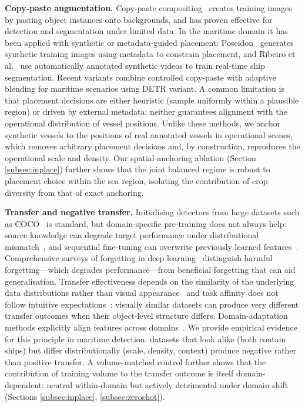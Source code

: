 \documentclass[10pt,conference]{IEEEtran}
\begin{document}
\textbf{Copy-paste augmentation.} Copy-paste compositing~\cite{ghiasi2021simple} creates training images by pasting object instances onto backgrounds, and has proven effective for detection and segmentation under limited data. In the maritime domain it has been applied with synthetic or metadata-guided placement: Poseidon~\cite{ruizponce2023poseidon} generates synthetic training images using metadata to constrain placement, and Ribeiro et al.~\cite{ribeiro2022synthetic} use automatically annotated synthetic videos to train real-time ship segmentation. Recent variants combine controlled copy-paste with adaptive blending for maritime scenarios using DETR variant\cite{nemati2025rtdetr}. A common limitation is that placement decisions are either heuristic (sample uniformly within a plausible region) or driven by external metadata; neither guarantees alignment with the operational distribution of vessel positions. Unlike these methods, we anchor synthetic vessels to the positions of real annotated vessels in operational scenes, which removes arbitrary placement decisions and, by construction, reproduces the operational scale and density. Our spatial-anchoring ablation (Section \ref{subsec:inplace}) further shows that the joint balanced regime is robust to placement choice within the sea region, isolating the contribution of crop diversity from that of exact anchoring.

\textbf{Transfer and negative transfer.} Initialising detectors from large datasets such as COCO~\cite{lin2014microsoft} is standard, but domain-specific pre-training does not always help: source knowledge can degrade target performance under distributional mismatch~\cite{zhang2023negative}, and sequential fine-tuning can overwrite previously learned features~\cite{mccloskey1989catastrophic}. Comprehensive surveys of forgetting in deep learning~\cite{yang2024forgetting} distinguish harmful forgetting—which degrades performance—from beneficial forgetting that can aid generalisation. Transfer effectiveness depends on the similarity of the underlying data distributions rather than visual appearance~\cite{cui2018large} and task affinity does not follow intuitive expectations~\cite{zamir2018taskonomy}: visually similar datasets can produce very different transfer outcomes when their object-level structure differs. Domain-adaptation methods explicitly align features across domains~\cite{chen2018domain}. We provide empirical evidence for this principle in maritime detection: datasets that look alike (both contain ships) but differ distributionally (scale, density, context) produce negative rather than positive transfer. A volume-matched control further shows that the contribution of training volume to the transfer outcome is itself domain-dependent: neutral within-domain but actively detrimental under domain shift (Sections \ref{subsec:inplace}, \ref{subsec:zeroshot}).
\end{document}
